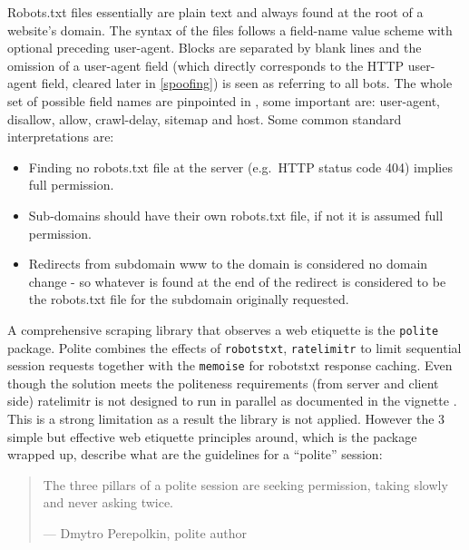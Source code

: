 \documentclass[
  12pt,
  a4paper,
  oneside]{book}
\newcommand{\passthrough}[1]{#1}
\providecommand{\tightlist}{%
  \setlength{\itemsep}{0pt}\setlength{\parskip}{0pt}}
\theoremstyle{definition}
\theoremstyle{definition}
\theoremstyle{definition}
\theoremstyle{remark}
\begin{document}
Robots.txt files \citep{robotstxt} essentially are plain text and always found at the root of a website's domain. The syntax of the files follows a field-name value scheme with optional preceding user-agent. Blocks are separated by blank lines and the omission of a user-agent field (which directly corresponds to the HTTP user-agent field, cleared later in \ref{spoofing}) is seen as referring to all bots. The whole set of possible field names are pinpointed in \citet{google:robottxt}, some important are: user-agent, disallow, allow, crawl-delay, sitemap and host. Some common standard interpretations are:

\begin{itemize}
\tightlist
\item
  Finding no robots.txt file at the server (e.g.~HTTP status code 404) implies full permission.
\item
  Sub-domains should have their own robots.txt file, if not it is assumed full permission.
\item
  Redirects from subdomain www to the domain is considered no domain change - so whatever is found at the end of the redirect is considered to be the robots.txt file for the subdomain originally requested.
\end{itemize}

A comprehensive scraping library that observes a web etiquette is the \passthrough{\lstinline!polite!} \citep{polite} package. Polite combines the effects of \passthrough{\lstinline!robotstxt!}, \passthrough{\lstinline!ratelimitr!} \citeyearpar{ratelimitr} to limit sequential session requests together with the \passthrough{\lstinline!memoise!} \citep{memoise} for robotstxt response caching. Even though the solution meets the politeness requirements (from server and client side) ratelimitr is not designed to run in parallel as documented in the vignette \citep{ratelimitr}. This is a strong limitation as a result the library is not applied. However the 3 simple but effective web etiquette principles around, which is the package wrapped up, describe what are the guidelines for a ``polite'' session:

\begin{quote}
The three pillars of a polite session are seeking permission, taking slowly and never asking twice.

\hfill --- Dmytro Perepolkin, polite author
\end{quote}
\end{document}
